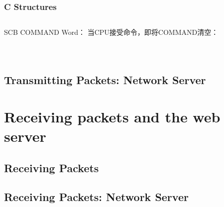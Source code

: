 \documentclass{article}
\begin{document}
\begin{CJK*}{UTF8}{gkai}
\begin{lstlisting}[style=ccode, title={\scriptsize \ttfamily \bfseries kern/pci.c}]
\end{lstlisting}


\begin{lstlisting}[style=ccode, title={\scriptsize \ttfamily \bfseries kern/pci.c}]
\end{lstlisting}


\subsubsection{C Structures}

\begin{lstlisting}[style=exercise]
\end{lstlisting}




SCB COMMAND Word： 当CPU接受命令，即将COMMAND清空：

\begin{lstlisting}[style=ccode, title={\scriptsize \ttfamily \bfseries kern/pci.c}]
\end{lstlisting}


\begin{lstlisting}[style=ccode, title={\scriptsize \ttfamily \bfseries kern/pci.c}]
\end{lstlisting}


\begin{lstlisting}[style=ccode, title={\scriptsize \ttfamily \bfseries kern/pci.c}]
\end{lstlisting}



\subsection{Transmitting Packets: Network Server}


\section{Receiving packets and the web server}

\subsection{Receiving Packets}

\subsection{Receiving Packets: Network Server}


\end{CJK*}
\end{document}
